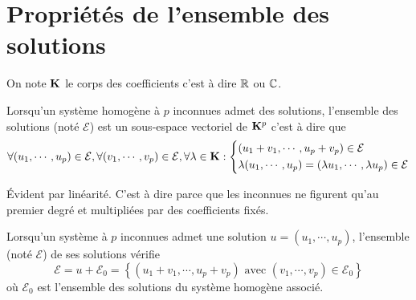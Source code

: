 \section{Propriétés de l'ensemble des solutions}
On note $\mathbf{K}$ le corps des coefficients c'est à dire $\mathbb{R}$ ou $\mathbb{C}$.
\begin{prop}
 Lorsqu'un système homogène à $p$ inconnues admet des solutions, l'ensemble des solutions (noté $\mathcal{E}$) est un sous-espace vectoriel de $\mathbf{K}^p$ c'est à dire que
\begin{displaymath}
 \forall (u_1,\cdots,u_p)\in \mathcal{E}, \forall (v_1,\cdots,v_p)\in \mathcal{E}, \forall \lambda \in \mathbf{K}:
  \left\lbrace 
\begin{aligned}
 &(u_1+v_1,\cdots,u_p+v_p)\in \mathcal{E}\\
 &\lambda(u_1,\cdots,u_p)= (\lambda u_1,\cdots,\lambda u_p)\in \mathcal{E}
\end{aligned}
\right. 
\end{displaymath}
\end{prop}
\begin{demo}
 \'Evident par linéarité. C'est à dire parce que les inconnues ne figurent qu'au premier degré et multipliées par des coefficients fixés.
\end{demo}
\begin{prop}
 Lorsqu'un système à $p$ inconnues admet une solution $u=(u_1,\cdots,u_p)$, l'ensemble (noté $\mathcal{E}$) de ses solutions vérifie
\begin{displaymath}
 \mathcal{E} = u + \mathcal{E}_0=\left\lbrace (u_1+v_1,\cdots,u_p+v_p)\text{ avec } (v_1,\cdots,v_p)\in \mathcal{E}_0\right\rbrace 
\end{displaymath}
où $\mathcal{E}_0$ est l'ensemble des solutions du système homogène associé.
\end{prop}
